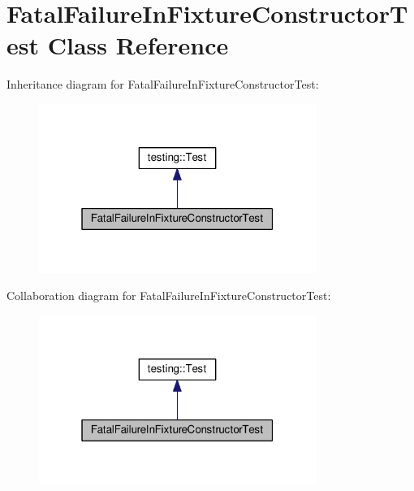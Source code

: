 \hypertarget{classFatalFailureInFixtureConstructorTest}{}\section{Fatal\+Failure\+In\+Fixture\+Constructor\+Test Class Reference}
\label{classFatalFailureInFixtureConstructorTest}


Inheritance diagram for Fatal\+Failure\+In\+Fixture\+Constructor\+Test\+:
\nopagebreak
\begin{figure}[H]
\begin{center}
\leavevmode
\includegraphics[width=256pt]{classFatalFailureInFixtureConstructorTest__inherit__graph}
\end{center}
\end{figure}


Collaboration diagram for Fatal\+Failure\+In\+Fixture\+Constructor\+Test\+:
\nopagebreak
\begin{figure}[H]
\begin{center}
\leavevmode
\includegraphics[width=256pt]{classFatalFailureInFixtureConstructorTest__coll__graph}
\end{center}
\end{figure}
